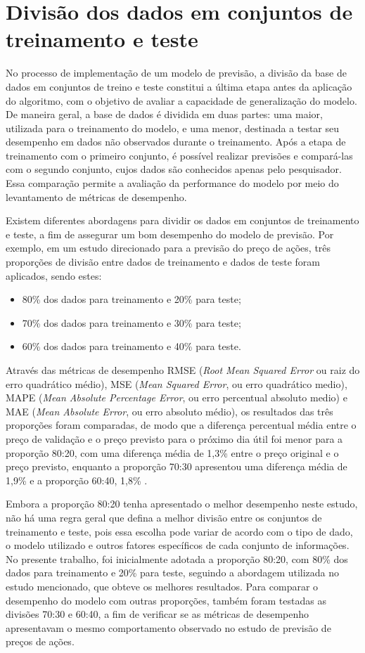 \section{Divisão dos dados em conjuntos de treinamento e teste}

No processo de implementação de um modelo de previsão, a divisão da base de dados em conjuntos de treino e teste constitui a última etapa antes da aplicação do algoritmo, com o objetivo de avaliar a capacidade de generalização do modelo. De maneira geral, a base de dados é dividida em duas partes: uma maior, utilizada para o treinamento do modelo, e uma menor, destinada a testar seu desempenho em dados não observados durante o treinamento. Após a etapa de treinamento com o primeiro conjunto, é possível realizar previsões e compará-las com o segundo conjunto, cujos dados são conhecidos apenas pelo pesquisador. Essa comparação permite a avaliação da performance do modelo por meio do levantamento de métricas de desempenho.

Existem diferentes abordagens para dividir os dados em conjuntos de treinamento e teste, a fim de assegurar um bom desempenho do modelo de previsão. Por exemplo, em um estudo direcionado para a previsão do preço de ações, três proporções de divisão entre dados de treinamento e dados de teste foram aplicados, sendo estes:

\begin{itemize}
	\item 80\% dos dados para treinamento e 20\% para teste;
	\item 70\% dos dados para treinamento e 30\% para teste;
	\item 60\% dos dados para treinamento e 40\% para teste.
\end{itemize}

Através das métricas de desempenho RMSE (\textit{Root Mean Squared Error} ou raiz do erro quadrático médio), MSE (\textit{Mean Squared Error}, ou erro quadrático medio), MAPE (\textit{Mean Absolute Percentage Error}, ou erro percentual absoluto medio) e MAE (\textit{Mean Absolute Error}, ou erro absoluto médio), os resultados das três proporções foram comparadas, de modo que a diferença percentual média entre o preço de validação e o preço previsto para o próximo dia útil foi menor para a proporção 80:20, com uma diferença média de 1,3\% entre o preço original e o preço previsto, enquanto a proporção 70:30 apresentou uma diferença média de 1,9\% e a proporção 60:40, 1,8\% \cite{supri2023asian}.

Embora a proporção 80:20 tenha apresentado o melhor desempenho neste estudo, não há uma regra geral que defina a melhor divisão entre os conjuntos de treinamento e teste, pois essa escolha pode variar de acordo com o tipo de dado, o modelo utilizado e outros fatores específicos de cada conjunto de informações. No presente trabalho, foi inicialmente adotada a proporção 80:20, com 80\% dos dados para treinamento e 20\% para teste, seguindo a abordagem utilizada no estudo mencionado, que obteve os melhores resultados. Para comparar o desempenho do modelo com outras proporções, também foram testadas as divisões 70:30 e 60:40, a fim de verificar se as métricas de desempenho apresentavam o mesmo comportamento observado no estudo de previsão de preços de ações.

